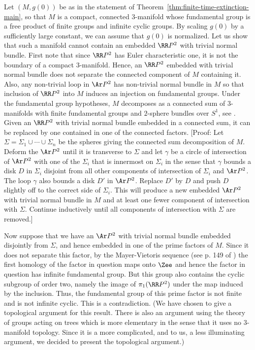 Let $(M,g(0))$ be as in the statement of Theorem~\ref{thm:finite-time-extinction-main}, so that $M$ is
a compact, connected $3$-manifold whose fundamental group is a free product of
finite groups and infinite cyclic groups. By scaling $g(0)$ by a sufficiently
large constant, we can assume that $g(0)$ is normalized. Let us show that such
a manifold cannot contain an embedded $\RR P^2$ with trivial normal bundle.
First note that since $\RR P^2$ has Euler characteristic one, it is not the
boundary of a compact $3$-manifold. Hence, an $\RR P^2$ embedded with trivial
normal bundle does not separate the connected component of $M$ containing it.
Also, any non-trivial loop in $\Ar P^2$ has non-trivial normal bundle in $M$ so
that inclusion of $\RR P^2$ into $M$ induces an injection on fundamental
groups. Under the fundamental group hypotheses, $M$ decomposes as a connected
sum of $3$-manifolds with finite fundamental groups and $2$-sphere bundles over
$S^1$, see \cite{Hempel}.
 Given
an $\RR P^2$ with trivial normal bundle embedded in a connected sum,
it can be replaced by one contained in one of the connected factors.
[Proof: Let $\Sigma=\Sigma_1\cup\cdots\cup\Sigma_n$ be the spheres
giving the connected sum decomposition of $M$.  Deform the $\Ar P^2$
until it is transverse to $\Sigma$ and let $\gamma$ be a circle of
intersection of $\Ar P^2$ with one of the $\Sigma_i$ that is
innermost on $\Sigma_i$ in the sense that $\gamma$ bounds a disk $D$
in $\Sigma_i$ disjoint from all other components of intersection of
$\Sigma_i$ and $\Ar P^2$. The loop $\gamma$ also bounds a disk $D'$
in $\Ar P^2$. Replace $D'$ by $D$ and push $D$ slightly off to the
correct side of $\Sigma_i$. This will produce a new embedded $\Ar
P^2$ with trivial normal bundle in $M$ and at least one fewer
component of intersection with $\Sigma$. Continue inductively until
all components of intersection with $\Sigma$ are removed.]

Now suppose that we have an $\Ar P^2$ with trivial normal bundle
embedded disjointly from $\Sigma$, and hence embedded in one of the
prime factors of $M$.
 Since it
does not separate this factor, by the Mayer-Vietoris sequence (see p. 149 of
\cite{Hatcher}) the first homology of the factor in question maps onto $\Zee$
and hence the factor in question has infinite fundamental group. But this group
also contains the cyclic subgroup of order two, namely the image of $\pi_1(\RR
P^2)$ under the map induced by the inclusion. Thus, the fundamental group of
this prime factor is not finite and is not infinite cyclic. This is a
contradiction. (We have chosen to give a topological argument for this result.
There is also an argument using the theory of groups acting on trees which is
more elementary in the sense that it uses no $3$-manifold topology. Since it is
a more complicated, and to us, a less illuminating argument, we decided to
present the topological argument.)

